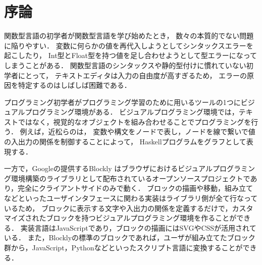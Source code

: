 \chapter{序論}\label{chap:intro}

関数型言語の初学者が関数型言語を学び始めたとき，
数々の本質的でない問題に陥りやすい．
変数に何らかの値を再代入しようとしてシンタックスエラーを起こしたり，
Int型とFloat型を持つ値を足し合わせようとして型エラーになってしまうことがある．
関数型言語のシンタックスや静的型付けに慣れていない初学者にとって，
テキストエディタは入力の自由度が高すぎるため，
エラーの原因を特定するのはしばしば困難である．

プログラミング初学者がプログラミング学習のために用いるツールの1つにビジュアルプログラミング環境がある\cite{Viscuit,Scratch,Snap}．
ビジュアルプログラミング環境では，テキストではなく，視覚的なオブジェクトを組み合わせることでプログラミングを行う．
例えば，近松らの\cite{HaskellVP}は，
変数や構文をノードで表し，ノードを線で繋いで値の入出力の関係を制御することによって，
Haskellプログラムをグラフとして表現する．

一方で，Googleの提供するBlockly \cite{Blockly}はブラウザにおけるビジュアルプログラミング環境構築のライブラリとして配布されているオープンソースプロジェクトであり，完全にクライアントサイドのみで動く．
ブロックの描画や移動，組み立てなどといったユーザインタフェースに関わる実装はライブラリ側が全て行なっているため，
ブロックに表示する文字や入出力の関係を定義するだけで，カスタマイズされたブロックを持つビジュアルプログラミング環境を作ることができる．
実装言語はJavaScriptであり，ブロックの描画にはSVGやCSSが活用されている．
また，Blocklyの標準のブロックであれば，ユーザが組み立てたブロック群から，JavaScript，Pythonなどといったスクリプト言語に変換することができる．

